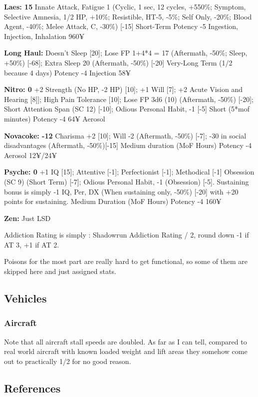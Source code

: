 \begin{multicols*}{2}
	\textbf{Laes: 15}
	Innate Attack, Fatigue 1 (Cyclic, 1 sec, 12 cycles, +550\%; Symptom, Selective Amnesia, 1/2 HP, +10\%; Resistible, HT-5, -5\%; Self Only, -20\%; Blood Agent, -40\%; Melee Attack, C, -30\%) [-15]
	Short-Term
	Potency -5
	Ingestion, Injection, Inhalation
	960¥
	
	\textbf{Long Haul: }
	Doesn't Sleep [20]; Lose FP 1+4*4 = 17 (Aftermath, -50\%; Sleep, +50\%) [-68]; Extra Sleep 20 (Aftermath, -50\%) [-20]
	Very-Long Term (1/2 because 4 days)
	Potency -4
	Injection
	58¥
	
	\textbf{Nitro: 0}
	+2 Strength (No HP, -2 HP) [10]; +1 Will [7]; +2 Acute Vision and Hearing [8]]; High Pain Tolerance [10]; Lose FP 3d6 (10) (Aftermath, -50\%) [-20]; Short Attention Span (SC 12) [-10]; Odious Personal Habit, -1 [-5]
	Short (5*mof minutes)
	Potency -4
	64¥
	Aerosol
	
	\textbf{Novacoke: -12}
	Charisma +2 [10]; Will -2 (Aftermath, -50\%) [-7]; -30 in social disadvantages (Aftermath, -50\%)[-15]
	Medium duration (MoF Hours)
	Potency -4
	Aerosol
	12¥/24¥
	
	\textbf{Psyche: 0}
	+1 IQ [15]; Attentive [-1]; Perfectionist [-1]; Methodical [-1] Obsession (SC 9) (Short Term) [-7]; Odious Personal Habit, -1 (Obsession) [-5]. Sustaining bonus is simply -1 IQ, Per, DX (When sustaining only, -50\%) [-20] with +20 points for sustaining.
	Medium Duration (MoF Hours)
	Potency	-4
	160¥
	
	\textbf{Zen: }
	Just LSD
	
	Addiction Rating is simply : Shadowrun Addiction Rating  / 2, round down -1 if AT 3, +1 if AT 2.
	
	
	Poisons for the most part are really hard to get functional, so some of them are skipped here and just assigned stats.
	
	\subsection{Vehicles}
	
	\subsubsection{Aircraft}
	
	Note that all aircraft stall speeds are doubled. As far as I can tell, compared to real world aircraft with known loaded weight and lift areas they somehow come out to practically 1/2 for no good reason.
	
	\subsection{References}
	

\end{multicols*}
